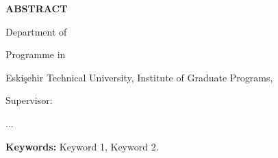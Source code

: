\begin{center}
\textbf{ABSTRACT}\bigskip

\paramtitle
\vspace{2\baselineskip}

\paramauthor \bigskip

Department of \paramdept

Programme in \paramprogram

Eskişehir Technical University, Institute of Graduate Programs, \parammonth~\paramyear \bigskip

Supervisor: \paramsupervisor
\end{center}
\vspace{\baselineskip}

\noindent ...
\vspace{\baselineskip}

\noindent \textbf{Keywords:} Keyword 1, Keyword 2.

\newpage
